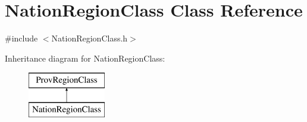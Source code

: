 \hypertarget{class_nation_region_class}{}\section{Nation\+Region\+Class Class Reference}
\label{class_nation_region_class}


{\ttfamily \#include $<$Nation\+Region\+Class.\+h$>$}

Inheritance diagram for Nation\+Region\+Class\+:\begin{figure}[H]
\begin{center}
\leavevmode
\includegraphics[height=2.000000cm]{class_nation_region_class}
\end{center}
\end{figure}
